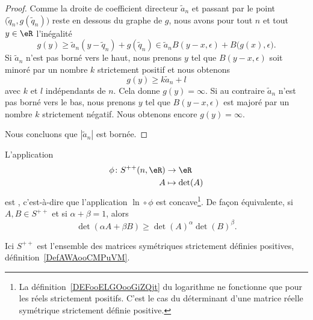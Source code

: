 \begin{proof}
    Comme la droite de coefficient directeur \( \tilde a_n\) et passant par le point \( \big( \tilde q_n,g(\tilde q_n) \big)\) reste en dessous du graphe de \( g\), nous avons pour tout \( n\) et tout \( y\in \eR\) l'inégalité
    \begin{equation}
        g(y)\geq \tilde a_n(y-\tilde q_n)+g(\tilde q_n)\in \tilde a_nB(y-x,\epsilon)+B\big( g(x),\epsilon \big).
    \end{equation}
    Si \( \tilde a_n\) n'est pas borné vers le haut, nous prenons \( y\) tel que \( B(y-x,\epsilon)\) soit minoré par un nombre \( k\) strictement positif et nous obtenons
    \begin{equation}
        g(y)\geq k\tilde a_n+l
    \end{equation}
    avec \( k\) et \( l\) indépendants de \( n\). Cela donne \( g(y)=\infty\). Si au contraire \( \tilde a_n\) n'est pas borné vers le bas, nous prenons $y$ tel que \( B(y-x,\epsilon)\) est majoré par un nombre \( k\) strictement négatif. Nous obtenons encore \( g(y)=\infty\).

    Nous concluons que \( | \tilde a_n |\) est bornée.
\end{proof}

\begin{lemma}   \label{LemXOUooQsigHs}
    L'application
    \begin{equation}
        \begin{aligned}
            \phi\colon S^{++}(n,\eR)  & \to \eR   \\
                          A           & \mapsto \det(A)
        \end{aligned}
    \end{equation}
    est , c'est-à-dire que l'application \( \ln\circ\phi\) est concave\footnote{La définition~\ref{DEFooELGOooGiZQjt} du logarithme ne fonctionne que pour les réels strictement positifs. C'est le cas du déterminant d'une matrice réelle symétrique strictement définie positive.}. De façon équivalente, si \( A,B\in S^{++}\) et si \( \alpha+\beta=1\), alors
    \begin{equation}    \label{EqSPKooHFZvmB}
        \det(\alpha A+\beta B)\geq \det(A)^{\alpha}\det(B)^{\beta}.
    \end{equation}
\end{lemma}
Ici \( S^{++}\) est l'ensemble des matrices symétriques strictement définies positives, définition~\ref{DefAWAooCMPuVM}.

